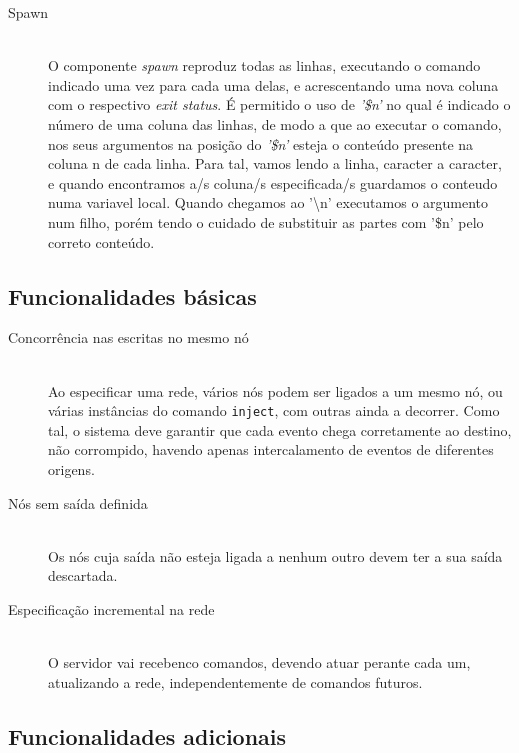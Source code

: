 \documentclass[12pt]{article}
\begin{document}
\begin{description}
\item[Spawn] \hfill \\
    O componente \textit{spawn} reproduz todas as linhas, executando o comando indicado uma vez para cada uma delas, e acrescentando uma nova coluna com o respectivo \textit{exit status}. É permitido o uso de \textit{'\$n'} no qual é indicado o número de uma coluna das linhas, de modo a que ao executar o comando, nos seus argumentos na posição do \textit{'\$n'} esteja o conteúdo presente na coluna n de cada linha. Para tal, vamos lendo a linha, caracter a caracter, e quando encontramos a/s coluna/s especificada/s guardamos o conteudo numa variavel local. Quando chegamos ao '\textbackslash n' executamos o argumento num filho, porém tendo o cuidado de substituir as partes com '\$n' pelo correto conteúdo.  

\end{description} 

\subsection{Funcionalidades básicas}
\begin{description} 

\item[Concorrência nas escritas no mesmo nó] \hfill \\
Ao especificar uma rede, vários nós podem ser ligados a um mesmo nó, ou várias instâncias do comando \texttt{inject}, com outras ainda a decorrer. Como tal, o sistema deve garantir que cada evento chega corretamente ao destino, não corrompido, havendo apenas intercalamento de eventos de diferentes origens.

\item[Nós sem saída definida] \hfill \\
Os nós cuja saída não esteja ligada a nenhum outro devem ter a sua saída descartada.

\item[Especificação incremental na rede] \hfill \\
O servidor vai recebenco comandos, devendo atuar perante cada um, atualizando a rede, independentemente de comandos futuros.

\end{description}

\subsection{Funcionalidades adicionais}
\end{document}
